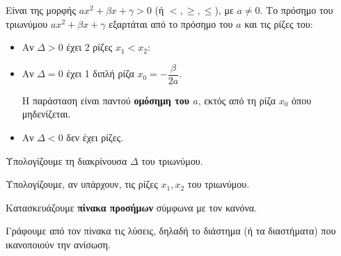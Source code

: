 Είναι της μορφής $a x^2 + \beta x + \gamma > 0$ (ή $<, \ge, \le$), με $a \neq 0$.
Το πρόσημο του τριωνύμου $a x^2 + \beta x + \gamma$ εξαρτάται από το πρόσημο του $a$ και τις ρίζες του:
\begin{itemize}
    \item Αν $\Delta > 0$ έχει 2 ρίζες $x_1 < x_2$:
    \begin{center}
    \end{center}
    
    \item Αν $\Delta = 0$ έχει 1 διπλή ρίζα $x_0 = -\dfrac{\beta}{2a}$.
    \begin{center}
    \end{center}
    Η παράσταση είναι παντού \textbf{ομόσημη του $a$}, εκτός από τη ρίζα $x_0$ όπου μηδενίζεται.
    
    \item Αν $\Delta < 0$ δεν έχει ρίζες.
    \begin{center}
    \end{center}
\end{itemize}

\bhmata
\begin{bhma}
    \item Υπολογίζουμε τη διακρίνουσα $\Delta$ του τριωνύμου.
	\item Υπολογίζουμε, αν υπάρχουν, τις ρίζες $x_1,x_2$ του τριωνύμου.
    \item Κατασκευάζουμε \textbf{πίνακα προσήμων} σύμφωνα με τον κανόνα.
    \item Γράφουμε από τον πίνακα τις λύσεις, δηλαδή το διάστημα (ή τα διαστήματα) που ικανοποιούν την ανίσωση.
\end{bhma}


